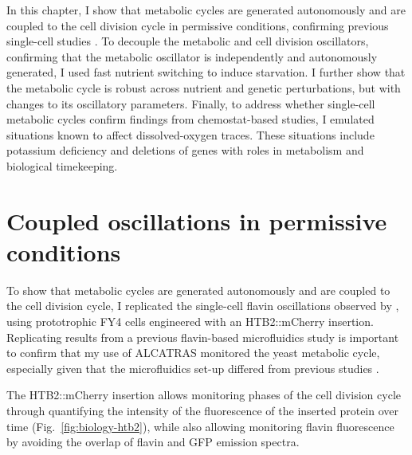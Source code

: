 In this chapter, I show that metabolic cycles are generated autonomously and are coupled to the cell division cycle in permissive conditions, confirming previous single-cell studies \parencite{papagiannakisAutonomousMetabolicOscillations2017,ozsezenInferenceHighLevelInteraction2019}.
To decouple the metabolic and cell division oscillators, confirming that the metabolic oscillator is independently and autonomously generated, I used fast nutrient switching to induce starvation.
I further show that the metabolic cycle is robust across nutrient and genetic perturbations, but with changes to its oscillatory parameters.
Finally, to address whether single-cell metabolic cycles confirm findings from chemostat-based studies, I emulated situations known to affect dissolved-oxygen traces.
These situations include potassium deficiency and deletions of genes with roles in metabolism and biological timekeeping.


\section{Coupled oscillations in permissive conditions}
\label{sec:biology-sync}

To show that metabolic cycles are generated autonomously and are coupled to the cell division cycle, I replicated the single-cell flavin oscillations observed by \textcite{baumgartnerFlavinbasedMetabolicCycles2018}, using prototrophic FY4 cells engineered with an HTB2::mCherry insertion.
Replicating results from a previous flavin-based microfluidics study is important to confirm that my use of ALCATRAS \parencite{craneMicrofluidicSystemStudying2014} monitored the yeast metabolic cycle, especially given that the microfluidics set-up differed from previous studies \parencite{papagiannakisAutonomousMetabolicOscillations2017, baumgartnerFlavinbasedMetabolicCycles2018}.

The HTB2::mCherry insertion allows monitoring phases of the cell division cycle through quantifying the intensity of the fluorescence of the inserted protein over time \parencite{garmendia-torresMultipleInputsEnsure2018} (Fig.\ \ref{fig:biology-htb2}), while also allowing monitoring flavin fluorescence by avoiding the overlap of flavin and GFP emission spectra.

